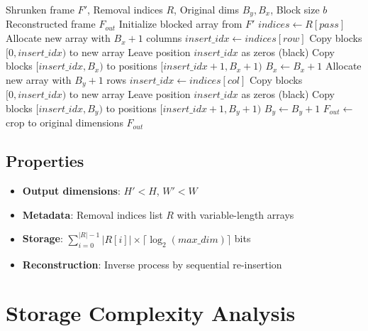 \documentclass[11pt,a4paper]{article}
\begin{document}
\begin{algorithm}[H]
\caption{Stretch Frame (Removal Indices)}
\begin{algorithmic}[1]
\Require Shrunken frame $F'$, Removal indices $R$, Original dims $B_y, B_x$, Block size $b$
\Ensure Reconstructed frame $F_{out}$
\State Initialize blocked array from $F'$
 
    \State $indices \gets R[pass]$
     
        \State Allocate new array with $B_x + 1$ columns
            \State $insert\_idx \gets indices[row]$
            \State Copy blocks $[0, insert\_idx)$ to new array
            \State Leave position $insert\_idx$ as zeros (black)
            \State Copy blocks $[insert\_idx, B_x)$ to positions $[insert\_idx+1, B_x+1)$
        \EndFor
        \State $B_x \gets B_x + 1$
    \Else {}
        \State Allocate new array with $B_y + 1$ rows
            \State $insert\_idx \gets indices[col]$
            \State Copy blocks $[0, insert\_idx)$ to new array
            \State Leave position $insert\_idx$ as zeros (black)
            \State Copy blocks $[insert\_idx, B_y)$ to positions $[insert\_idx+1, B_y+1)$
        \EndFor
        \State $B_y \gets B_y + 1$
    \EndIf
\EndFor
\State $F_{out} \gets$ crop to original dimensions
\State \Return $F_{out}$
\end{algorithmic}
\end{algorithm}

\subsection{Properties}
\begin{itemize}
    \item \textbf{Output dimensions}: $H' < H$, $W' < W$
    \item \textbf{Metadata}: Removal indices list $R$ with variable-length arrays
    \item \textbf{Storage}: $\sum_{i=0}^{|R|-1} |R[i]| \times \lceil\log_2(max\_dim)\rceil$ bits
    \item \textbf{Reconstruction}: Inverse process by sequential re-insertion
\end{itemize}

\section{Storage Complexity Analysis}
\end{document}
